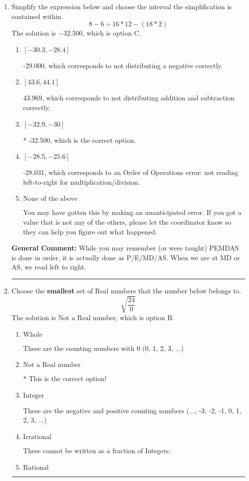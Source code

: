 \documentclass{extbook}[14pt]
\newcommand{\litem}[1]{\item #1

\rule{\textwidth}{0.4pt}}
\begin{document}
\begin{enumerate}\litem{
Simplify the expression below and choose the interval the simplification is contained within.
\[ 8 - 6 \div 16 * 12 - (18 * 2) \]The solution is \( -32.500 \), which is option C.\begin{enumerate}[label=\Alph*.]
\item \( [-30.3, -28.4] \)

 -29.000, which corresponds to not distributing a negative correctly.
\item \( [43.6, 44.1] \)

 43.969, which corresponds to not distributing addition and subtraction correctly.
\item \( [-32.9, -30] \)

* -32.500, which is the correct option.
\item \( [-28.5, -25.6] \)

 -28.031, which corresponds to an Order of Operations error: not reading left-to-right for multiplication/division.
\item \( \text{None of the above} \)

 You may have gotten this by making an unanticipated error. If you got a value that is not any of the others, please let the coordinator know so they can help you figure out what happened.
\end{enumerate}

\textbf{General Comment:} While you may remember (or were taught) PEMDAS is done in order, it is actually done as P/E/MD/AS. When we are at MD or AS, we read left to right.
}
\litem{
Choose the \textbf{smallest} set of Real numbers that the number below belongs to.
\[ \sqrt{\frac{24}{0}} \]The solution is \( \text{Not a Real number} \), which is option B.\begin{enumerate}[label=\Alph*.]
\item \( \text{Whole} \)

These are the counting numbers with 0 (0, 1, 2, 3, ...)
\item \( \text{Not a Real number} \)

* This is the correct option!
\item \( \text{Integer} \)

These are the negative and positive counting numbers (..., -3, -2, -1, 0, 1, 2, 3, ...)
\item \( \text{Irrational} \)

These cannot be written as a fraction of Integers.
\item \( \text{Rational} \)


\end{enumerate}}
\end{enumerate}
\end{document}
